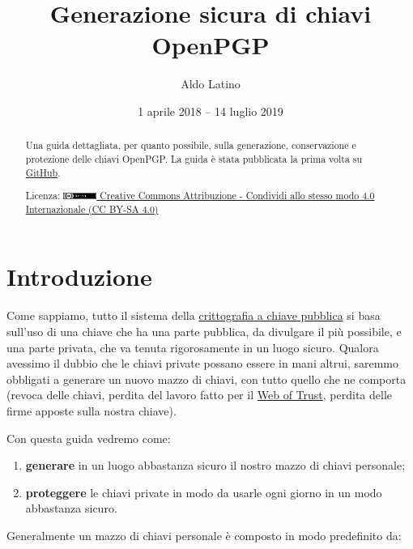 \documentclass[a4paper,10pt]{article}
\title{Generazione sicura di chiavi OpenPGP}
\author{Aldo Latino}
\date{1 aprile 2018 -- 14 luglio 2019}
\begin{document}
\maketitle

\begin{abstract}
Una guida dettagliata, per quanto possibile, sulla generazione, conservazione e protezione delle chiavi OpenPGP. La guida è stata pubblicata la prima volta su \href{https://github.com/aldolat/generazione-sicura-chiavi-openpgp}{GitHub}.

Licenza: \href{https://creativecommons.org/licenses/by-sa/4.0/deed.it}{\includegraphics[width=0.09\textwidth]{cc-80x15} Creative Commons Attribuzione - Condividi allo stesso modo 4.0 Internazionale (CC BY-SA 4.0)}
\end{abstract}

\newpage

\tableofcontents

\newpage

\section{Introduzione}

Come sappiamo, tutto il sistema della \href{https://it.wikipedia.org/wiki/Crittografia_asimmetrica}{crittografia a chiave pubblica} si basa sull'uso di una chiave che ha una parte pubblica, da divulgare il più possibile, e una parte privata, che va tenuta rigorosamente in un luogo sicuro. Qualora avessimo il dubbio che le chiavi private possano essere in mani altrui, saremmo obbligati a generare un nuovo mazzo di chiavi, con tutto quello che ne comporta (revoca delle chiavi, perdita del lavoro fatto per il \href{https://it.wikipedia.org/wiki/Web_of_trust}{Web of Trust}, perdita delle firme apposte sulla nostra chiave).

Con questa guida vedremo come:

\begin{enumerate}
 \item \textbf{generare} in un luogo abbastanza sicuro il nostro mazzo di chiavi personale;
 \item \textbf{proteggere} le chiavi private in modo da usarle ogni giorno in un modo abbastanza sicuro.
\end{enumerate}

Generalmente un mazzo di chiavi personale è composto in modo predefinito da:
\end{document}
